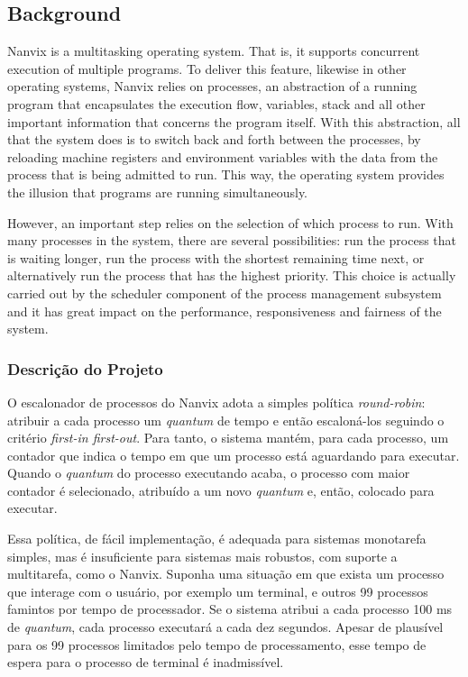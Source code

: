\documentclass[11pt]{article}
\newif\ifbr
\begin{document}
	\subsection*{Background}

	Nanvix is a multitasking operating system. That is, it supports
	concurrent execution of multiple programs. To deliver this feature,
	likewise in other operating systems, Nanvix relies on processes, an
	abstraction of a running program that encapsulates the execution
	flow, variables, stack and all other important information that
	concerns the program itself. With this abstraction, all that the
	system does is to switch back and forth between the processes, by
	reloading machine registers and environment variables with the data from
	the process that is being admitted to run. This way, the
	operating system provides the illusion that programs are running
	simultaneously.

	 However, an important step relies on the selection of which process
	 to run. With many processes in the system, there are several
	 possibilities: run the process that is waiting longer, run the
	 process with the shortest remaining time next, or alternatively run
	 the process that has the highest priority. This choice is actually
	 carried out by the scheduler component of the process management
	 subsystem and it has great impact on the performance,
	 responsiveness and fairness of the system.
\fi\fi

\ifbr
	\subsubsection*{Descrição do Projeto}

		O escalonador de processos do Nanvix adota a simples política
		\textit{round-robin}: atribuir a cada processo um \textit{quantum}
		de tempo e então escaloná-los seguindo o critério \textit{first-in
		first-out}. Para tanto, o sistema mantém, para cada processo, um
		contador que indica o tempo em que um processo está aguardando para
		executar. Quando o \textit{quantum} do processo executando acaba, o
		processo com maior contador é selecionado, atribuído a um novo
		\textit{quantum} e, então, colocado para executar.

		Essa política, de fácil implementação, é adequada para sistemas
		monotarefa simples, mas é insuficiente para sistemas mais robustos,
		com suporte a multitarefa, como o Nanvix. Suponha uma situação em
		que exista um processo que interage com o usuário, por exemplo um
		terminal, e outros 99 processos famintos por tempo de processador.
		Se o sistema atribui a cada processo 100 ms de \textit{quantum},
		cada processo executará a cada dez segundos. Apesar de plausível
		para os 99 processos limitados pelo tempo de processamento, esse
		tempo de espera para o processo de terminal é inadmissível.
\end{document}
